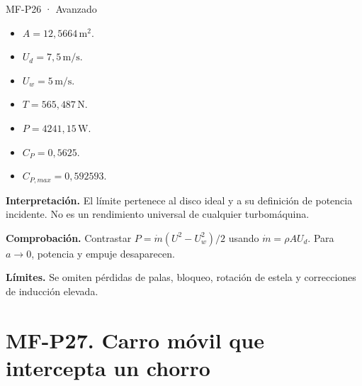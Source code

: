 \begin{studiumworked}{MF-P26 · Avanzado}
\begin{itemize}
\item $A=12{,}5664\,\mathrm{m^2}$.

\item $U_d=7{,}5\,\mathrm{m/s}$.

\item $U_w=5\,\mathrm{m/s}$.

\item $T=565{,}487\,\mathrm{N}$.

\item $P=4241{,}15\,\mathrm{W}$.

\item $C_P=0{,}5625$.

\item $C_{P,max}=0{,}592593$.

\end{itemize}

\textbf{Interpretación.} El límite pertenece al disco ideal y a su definición de potencia incidente. No es un rendimiento universal de cualquier turbomáquina.

\textbf{Comprobación.} Contrastar $P=\dot m(U^2-U_w^2)/2$ usando $\dot m=\rho AU_d$. Para $a\to0$, potencia y empuje desaparecen.

\textbf{Límites.} Se omiten pérdidas de palas, bloqueo, rotación de estela y correcciones de inducción elevada.

\end{studiumworked}



\Needspace{.30\textheight}\section{MF-P27. Carro móvil que intercepta un chorro}


